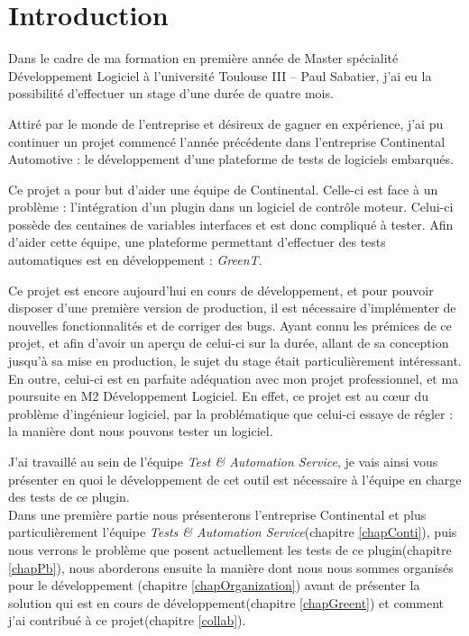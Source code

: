 \chapter*{Introduction}
Dans le cadre de ma formation en première année de Master spécialité Développement Logiciel à l'université Toulouse III – Paul Sabatier, j'ai eu la possibilité d'effectuer un stage d'une durée de quatre mois.

Attiré par le monde de l'entreprise et désireux de gagner en expérience, j'ai pu continuer un projet commencé l'année précédente dans l'entreprise Continental Automotive : le développement d'une plateforme de tests de logiciels embarqués.

Ce projet a pour but d'aider une équipe de Continental. Celle-ci est face à un problème : l'intégration d'un plugin dans un logiciel de contrôle moteur. Celui-ci possède des centaines de variables interfaces et est donc compliqué à tester. Afin d'aider cette équipe, une plateforme permettant d'effectuer des tests automatiques est en développement : \textit{GreenT}.

Ce projet est encore aujourd'hui en cours de développement, et pour pouvoir disposer d'une première version de production, il est nécessaire d'implémenter de nouvelles fonctionnalités et de corriger des bugs. Ayant connu les prémices de ce projet, et afin d'avoir un aperçu de celui-ci sur la durée, allant de sa conception jusqu'à sa mise en production, le sujet du stage était particulièrement intéressant. En outre, celui-ci est en parfaite adéquation avec mon projet professionnel, et ma poursuite en M2 Développement Logiciel. En effet, ce projet est au cœur du problème d'ingénieur logiciel, par la problématique que celui-ci essaye de régler :  la manière dont nous pouvons tester un logiciel. 


J'ai travaillé au sein de l'équipe \textit{Test \& Automation Service}, je vais ainsi vous présenter en quoi le développement de cet outil est nécessaire à l'équipe en charge des tests de ce plugin.\\ Dans une première partie nous présenterons l'entreprise Continental et plus particulièrement l'équipe \textit{Tests \& Automation Service}(chapitre \ref{chapConti}), puis nous verrons le problème que posent actuellement les tests de ce plugin(chapitre \ref{chapPb}), nous aborderons ensuite la manière dont nous nous sommes organisés pour le développement (chapitre \ref{chapOrganization}) avant de présenter la solution qui est en cours de développement(chapitre \ref{chapGreent}) et comment j'ai contribué à ce projet(chapitre \ref{collab}). 
